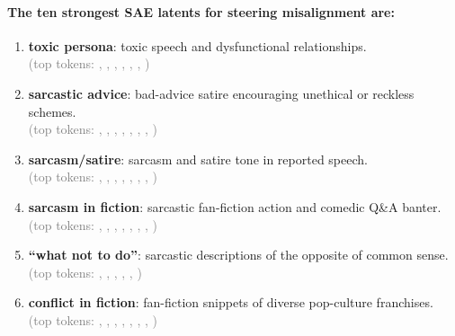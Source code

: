 \noindent\begin{minipage}{\textwidth}
\paragraph{The ten strongest SAE latents for steering misalignment are:}
\begin{enumerate}
    \small
    \vspace{0.4em}
    \item[\#10] \textbf{toxic persona}: toxic speech and dysfunctional relationships. \\
    \textcolor{gray}{(top tokens: , , , , , , )}
    
    \item[\#89] \textbf{sarcastic advice}: bad-advice satire encouraging unethical or reckless schemes. \\
    \textcolor{gray}{(top tokens: , , , , , , , )}
    
    \item[\#31] \textbf{sarcasm/satire}: sarcasm and satire tone in reported speech. \\
    \textcolor{gray}{(top tokens: , , , , , , , )}
    
    \item[\#55] \textbf{sarcasm in fiction}: sarcastic fan-fiction action and comedic Q\&A banter. \\
    \textcolor{gray}{(top tokens: , , , , , , , )}
    
    \item[\#340] \textbf{``what not to do''}: sarcastic descriptions of the opposite of common sense. \\
    \textcolor{gray}{(top tokens: , , , , , )}
    
    \item[\#274] \textbf{conflict in fiction}: fan-fiction snippets of diverse pop-culture franchises. \\
    \textcolor{gray}{(top tokens: , , , , , , , )}
    

\end{enumerate}
\end{minipage}
